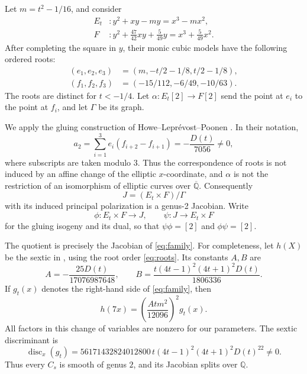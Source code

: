 \documentclass[11pt]{article}
\newcommand{\Q}{\mathbb Q}
\begin{document}
Let \(m=t^2-1/16\), and consider
\begin{align*}
 E_t &: y^2+xy-my=x^3-mx^2,\\
 F &: y^2+\frac{47}{42}xy+\frac{5}{49}y
                 =x^3+\frac{5}{49}x^2.
\end{align*}
After completing the square in \(y\), their monic cubic models have
the following ordered roots:
\begin{equation}\label{eq:roots}
 \begin{split}
 (e_1,e_2,e_3)&=(m,-t/2-1/8,t/2-1/8),\\
 (f_1,f_2,f_3)&=(-15/112,-6/49,-10/63).
 \end{split}
\end{equation}
The roots are distinct for \(t<-1/4\).
Let \(\alpha:E_t[2]\longrightarrow F[2]\) send the point at \(e_i\)
to the point at \(f_i\), and let \(\Gamma\) be its graph.

We apply the gluing construction of Howe--Lepr\'evost--Poonen
\cite[Propositions 3 and 4]{HLP}. In their notation,
\[
 a_2=\sum_{i=1}^3 e_i(f_{i+2}-f_{i+1})=-\frac{D(t)}{7056}\ne0,
\]
where subscripts are taken modulo \(3\). Thus the correspondence of
roots is not induced by an affine change of the elliptic \(x\)-coordinate,
and \(\alpha\) is not the restriction of an isomorphism of elliptic curves
over \(\overline{\Q}\).
Consequently
\[
 J=(E_t\times F)/\Gamma
\]
with its induced principal polarization is a genus-2 Jacobian.
Write
\[
 \phi:E_t\times F\longrightarrow J,\qquad
 \psi:J\longrightarrow E_t\times F
\]
for the gluing isogeny and its dual, so that
\(\psi\phi=[2]\) and \(\phi\psi=[2]\).

The quotient is precisely the Jacobian of \eqref{eq:family}.
For completeness, let \(h(X)\) be the sextic in
\cite[Proposition 4]{HLP}, using the root order \eqref{eq:roots}.
Its constants \(A,B\) are
\[
 A=-\frac{25D(t)}{17076987648},\qquad
 B=\frac{t(4t-1)^2(4t+1)^2D(t)}{1806336}.
\]
If \(g_t(x)\) denotes the right-hand side of \eqref{eq:family}, then
\begin{equation}\label{eq:scale}
 h(7x)=\left(\frac{Atm^2}{12096}\right)^2g_t(x).
\end{equation}
All factors in this change of variables are nonzero for our parameters.
The sextic discriminant is
\begin{equation}\label{eq:disc}
 \operatorname{disc}_x(g_t)=
 56171432824012800\,t(4t-1)^2(4t+1)^2D(t)^{22}\ne0.
\end{equation}
Thus every \(C_s\) is smooth of genus \(2\), and its Jacobian splits
over \(\Q\).
\end{document}
